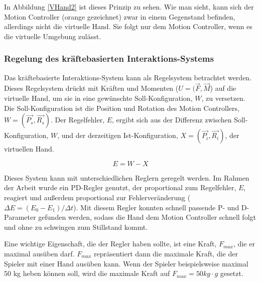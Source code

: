 In Abbildung \ref{VHand2} ist dieses Prinzip zu sehen. Wie man sieht, kann sich der \linebreak Motion Controller (orange gezeichnet) zwar in einem Gegenstand befinden, allerdings nicht die virtuelle Hand. Sie folgt nur dem Motion Controller, wenn es die virtuelle Umgebung zulässt.


\subsubsection{Regelung des kräftebasierten Interaktions-Systems}
Das kräftebasierte Interaktions-System kann als Regelsystem betrachtet werden. Dieses Regelsystem drückt mit Kräften und Momenten ($U = (\vec{F} , \vec{M}$) auf die virtuelle Hand, um sie in eine gewünschte Soll-Konfiguration, $W$, zu versetzen. Die Soll-Konfiguration ist die Position und Rotation des Motion Controllers, $W = (\vec{P_s} , \vec{R_s})$. Der Regelfehler, $E$, ergibt sich aus der Differenz zwischen Soll-Konfiguration, $W$, und der derzeitigen Ist-Konfiguration, $X = (\vec{P_i} , \vec{R_i})$, der virtuellen Hand.

\begin{equation}
E = W - X
\label{form_error}
\end{equation}

Dieses System kann mit unterschiedlichen Reglern geregelt werden. Im Rahmen der Arbeit wurde ein PD-Regler genutzt, der proportional zum Regelfehler, $E$, reagiert und außerdem proportional zur Fehlerveränderung ($\Delta E = (E_0 - E_1)/\Delta t$). Mit diesem Regler konnten schnell passende P- und D-Parameter gefunden werden, sodass die Hand dem Motion Controller schnell folgt und ohne zu schwingen zum Stillstand kommt.

Eine wichtige Eigenschaft, die der Regler haben sollte, ist eine Kraft, $F_{max}$, die er maximal ausüben darf. $F_{max}$ repräsentiert dann die maximale Kraft, die der Spieler mit einer Hand ausüben kann. Wenn der Spieler beispielsweise maximal 50 kg heben können soll, wird die maximale Kraft auf $F_{max} = 50kg \cdot g$ gesetzt.

